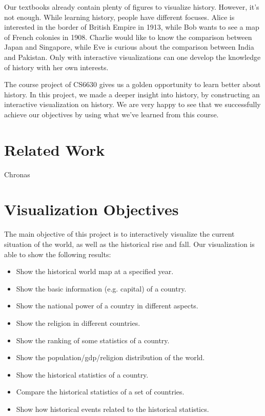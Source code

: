 \documentclass[12pt, fullpage,letterpaper]{article}
\begin{document}
Our textbooks already contain plenty of figures to visualize history. However,
it's not enough. While learning history, people have different focuses.  Alice
is interested in the border of British Empire in 1913, while Bob wants to see a
map of French colonies in 1908. Charlie would like to know the comparison
between Japan and Singapore, while Eve is curious about the comparison between
India and Pakistan.  Only with interactive visualizations can one develop the
knowledge of history with her own interests.

The course project of CS6630 gives us a golden opportunity to learn better
about history.  In this project, we made a deeper insight into history, by
constructing an interactive visualization on history. We are very happy to see
that we successfully achieve our objectives by using what we've learned from this course.

\section{Related Work}
Chronas

\section{Visualization Objectives}
The main objective of this project is to interactively visualize the current situation of the world,
as well as the historical rise and fall. Our visualization is able to show the following results:

\begin{itemize}

    \item Show the historical world map at a specified year.

    \item Show the basic information (e.g. capital) of a country.

    \item Show the national power of a country in different aspects.

    \item Show the religion in different countries.

    \item Show the ranking of some statistics of a country.

    \item Show the population/gdp/religion distribution of the world.

    \item Show the historical statistics of a country.

    \item Compare the historical statistics of a set of countries.

    \item Show how historical events related to the historical statistics.

\end{itemize}
\end{document}
